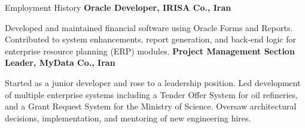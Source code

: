 \begin{rubric}{Employment History}
%
	\textbf{Oracle Developer, IRISA Co., Iran}\par
	Developed and maintained financial software using Oracle Forms and Reports. Contributed to system enhancements, report generation, and back-end logic for enterprise resource planning (ERP) modules.
%
	\textbf{Project Management Section Leader, MyData Co., Iran}\par
	Started as a junior developer and rose to a leadership position. Led development of multiple enterprise systems including a Tender Offer System for oil refineries, and a Grant Request System for the Ministry of Science. Oversaw architectural decisions, implementation, and mentoring of new engineering hires.
\end{rubric}
